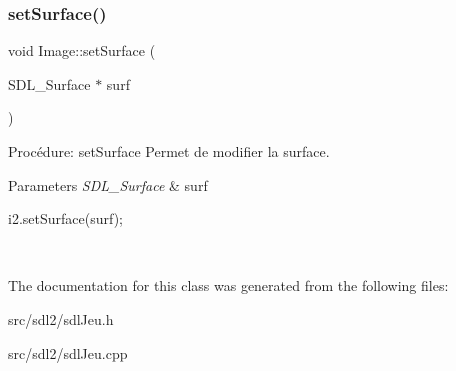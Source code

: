 \subsubsection{\texorpdfstring{set\+Surface()}{setSurface()}}
{\footnotesize\ttfamily void Image\+::set\+Surface (\begin{DoxyParamCaption}\item[{S\+D\+L\+\_\+\+Surface $\ast$}]{surf }\end{DoxyParamCaption})}



Procédure\+: set\+Surface Permet de modifier la surface. 


\begin{DoxyParams}{Parameters}
{\em S\+D\+L\+\_\+\+Surface} & surf 
\begin{DoxyCode}
i2.setSurface(surf);
\end{DoxyCode}
 \\
\hline
\end{DoxyParams}


The documentation for this class was generated from the following files\+:\begin{DoxyCompactItemize}
\item 
src/sdl2/sdl\+Jeu.\+h\item 
src/sdl2/sdl\+Jeu.\+cpp\end{DoxyCompactItemize}
